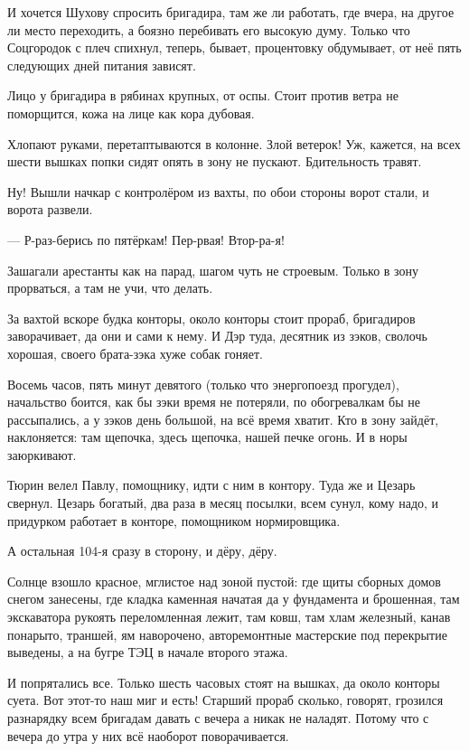 И хочется Шухову спросить бригадира, там же ли работать, где вчера, на другое ли место
переходить, \dash а боязно перебивать его высокую думу. Только что Соцгородок с плеч спихнул,
теперь, бывает, процентовку обдумывает, от неё пять следующих дней питания зависят.

Лицо у бригадира в рябинах крупных, от оспы. Стоит против ветра \dash не поморщится, кожа на лице
\dash как кора дубовая.

Хлопают руками, перетаптываются в колонне. Злой ветерок! Уж, кажется, на всех шести вышках
попки сидят \dash опять в зону не пускают. Бдительность травят.

Ну! Вышли начкар с контролёром из вахты, по обои стороны ворот стали, и ворота развели.

--- Р-раз-берись по пятёркам! Пер-рвая! Втор-ра-я!

Зашагали арестанты как на парад, шагом чуть не строевым. Только в зону прорваться, а там не
учи, что делать.

За вахтой вскоре \dash будка конторы, около конторы стоит прораб, бригадиров заворачивает, да
они и сами к нему. И Дэр туда, десятник из зэков, сволочь хорошая, своего брата-зэка хуже собак
гоняет.

Восемь часов, пять минут девятого (только что энергопоезд прогудел), начальство боится, как
бы зэки время не потеряли, по обогревалкам бы не рассыпались, \dash а у зэков день большой, на всё
время хватит. Кто в зону зайдёт, наклоняется: там щепочка, здесь щепочка, нашей печке огонь. И
в норы заюркивают.

Тюрин велел Павлу, помощнику, идти с ним в контору. Туда же и Цезарь свернул. Цезарь богатый,
два раза в месяц посылки, всем сунул, кому надо, \dash и придурком работает в конторе, помощником
нормировщика.

А остальная 104-я сразу в сторону, и дёру, дёру.

Солнце взошло красное, мглистое над зоной пустой: где щиты сборных домов снегом занесены,
где кладка каменная начатая да у фундамента и брошенная, там экскаватора рукоять
переломленная лежит, там ковш, там хлам железный, канав понарыто, траншей, ям наворочено,
авторемонтные мастерские под перекрытие выведены, а на бугре \dash ТЭЦ в начале второго этажа.

И \dash попрятались все. Только шесть часовых стоят на вышках, да около конторы суета. Вот
этот-то наш миг и есть! Старший прораб сколько, говорят, грозился разнарядку всем бригадам
давать с вечера \dash а никак не наладят. Потому что с вечера до утра у них всё наоборот
поворачивается.

